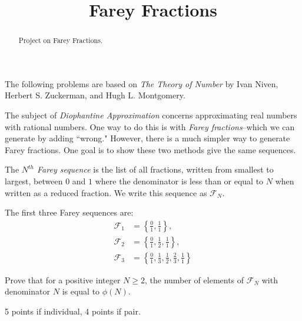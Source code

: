 \documentclass[letterpaper, 11 pt]{ximera}
\title{Farey Fractions}
\begin{document}
\begin{abstract}
 Project on Farey Fractions.
\end{abstract}
\maketitle

The following problems are based on \emph{The Theory of Number} by Ivan Niven, Herbert S. Zuckerman, and Hugh L. Montgomery.

The subject of \emph{Diophantine Approximation} concerns approximating real numbers with rational numbers.  One way to do this is with \emph{Farey fractions}--which we can generate by adding ``wrong." However, there is a much simpler way to generate Farey fractions. One goal is to show these two methods give the same sequences.

\begin{exploration}
 \begin{definition}
 The \emph{$N^{th}$ Farey sequence} is the list of all fractions, written from smallest to largest, between $0$ and $1$ where the denominator is less than or equal to $N$ when written as a reduced fraction. We write this sequence as $\mathcal{F}_N$.
\end{definition}

The first three Farey sequences are:
\begin{align*}
    \mathcal{F}_1 &= \left\{\frac 01, \frac 11 \right\}, \\
    \mathcal{F}_2 &= \left\{ \frac 01, \frac 12, \frac 11 \right\}, \\
    \mathcal{F}_3 &= \left\{ \frac 01, \frac 13, \frac 12, \frac 23, \frac 11 \right\}
    \end{align*}


\begin{problem}
	Prove that for a positive integer $N\geq 2$, the number of elements of $\mathcal{F}_N$ with denominator $N$ is equal to $\phi(N)$.
\begin{rubric}
5 points if individual, 4 points if pair.
\end{rubric}
\end{problem}
\end{exploration}
\end{document}
